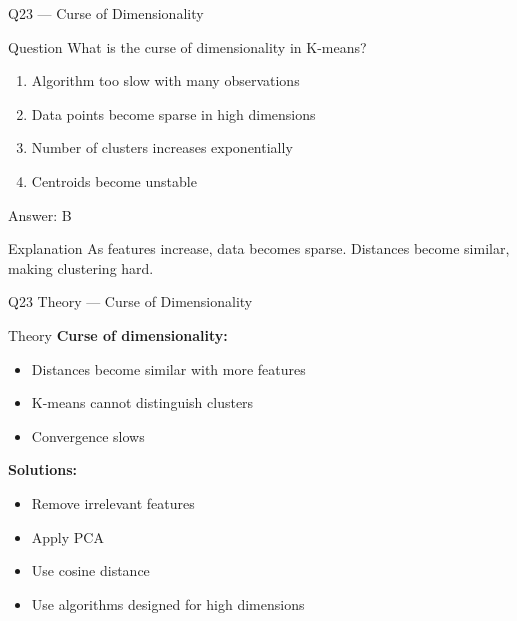 \documentclass[aspectratio=169,8pt]{beamer}
\begin{document}
	\begin{frame}{Q23 --- Curse of Dimensionality}
		\begin{block}{Question}
			What is the curse of dimensionality in K-means?
		\end{block}
		\begin{enumerate}[label=\Alph*.]
			\item Algorithm too slow with many observations
			\item Data points become sparse in high dimensions
			\item Number of clusters increases exponentially
			\item Centroids become unstable
		\end{enumerate}
		\begin{exampleblock}{Answer: B}
		\end{exampleblock}
		\begin{block}{Explanation}
			As features increase, data becomes sparse. Distances become similar, making clustering hard.
		\end{block}
	\end{frame}
	
	\begin{frame}{Q23 Theory --- Curse of Dimensionality}
		\begin{block}{Theory}
			\textbf{Curse of dimensionality:}
			\begin{itemize}
				\item Distances become similar with more features
				\item K-means cannot distinguish clusters
				\item Convergence slows
			\end{itemize}
			\textbf{Solutions:}
			\begin{itemize}
				\item Remove irrelevant features
				\item Apply PCA
				\item Use cosine distance
				\item Use algorithms designed for high dimensions
			\end{itemize}
		\end{block}
	\end{frame}
	
\end{document}
